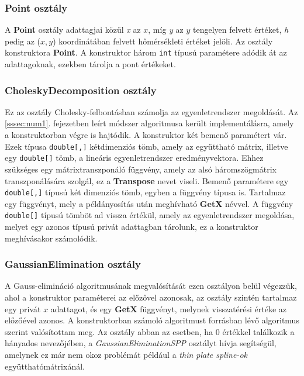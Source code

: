		
		\subsubsection{Point osztály}
		
			A \textbf{Point} osztály adattagjai közül \textit{x} az $x$, míg  \textit{y} az $y$ tengelyen felvett értéket, \textit{h} pedig az ($x,y$) koordinátában felvett hőmérsékleti értéket jelöli. Az osztály konstruktora \textbf{Point}. A konstruktor három \texttt{int} típusú paramétere adódik át az adattagoknak, ezekben tárolja a pont értékeket.
			
		\subsubsection{CholeskyDecomposition osztály}
		
			Ez az osztály Cholesky-felbontásban számolja az egyenletrendszer megoldását. Az \ref{sssec:num1}. fejezetben leírt módszer algoritmusa került implementálásra, amely a konstruktorban végre is hajtódik. A konstruktor két bemenő paramétert vár. Ezek típusa \texttt{double[,]} kétdimenziós tömb, amely az együttható mátrix, illetve egy \texttt{double[]} tömb, a lineáris egyenletrendszer eredményvektora. Ehhez szükséges egy mátrixtranszponáló függvény, amely az alsó háromszögmátrix transzponálására szolgál, ez a \textbf{Transpose} nevet viseli. Bemenő paramétere egy \texttt{double[,]} típusú két dimenziós tömb, egyben a függvény típusa is. Tartalmaz egy függvényt, mely a példányosítás után meghívható \textbf{GetX} névvel. A függvény \texttt{double[]} típusú tömböt ad vissza értékül, amely az egyenletrendszer megoldása, melyet egy azonos típusú privát adattagban tárolunk, ez a konstruktor meghívásakor számolódik.  
			
		\subsubsection{GaussianElimination osztály}
			
			A Gauss-elimináció algoritmusának megvalósítását ezen osztályon belül végezzük, ahol a konstruktor paraméterei az előzővel azonosak, az osztály szintén tartalmaz egy privát $x$ adattagot, és egy \textbf{GetX} függvényt, melynek visszatérési értéke az előzőével azonos. A konstruktorban számoló algoritmust \cite{gaussian} forrásban lévő algoritmus szerint valósítottam meg. Az osztály abban az esetben, ha $0$ értékkel találkozik a hányados nevezőjében, a \textit{GaussianEliminationSPP} osztályt hívja segítségül, amelynek ez már nem okoz problémát például a \textit{thin plate spline-ok} együtthatómátrixánál.
		
